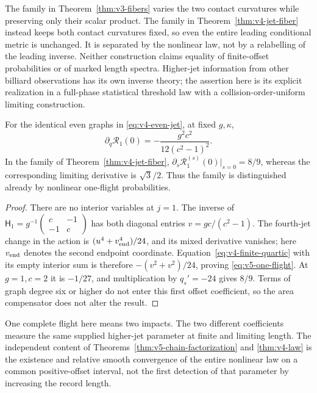 The family in Theorem~\ref{thm:v3-fibers} varies the two contact
curvatures while preserving only their scalar product. The family in
Theorem~\ref{thm:v4-jet-fiber} instead keeps both contact curvatures
fixed, so even the entire leading conditional metric is unchanged.
It is separated by the nonlinear law, not by a relabelling of the
leading inverse. Neither construction claims equality of finite-offset
probabilities or of marked length spectra. Higher-jet information from
other billiard observations has its own inverse theory; the assertion
here is its explicit realization in a full-phase statistical threshold
law with a collision-order-uniform limiting construction.


\begin{proposition}
\label{prop:v5-one-flight}
For the identical even graphs in \eqref{eq:v4-even-jet}, at fixed
$g,\kappa$,
\begin{equation}\label{eq:v5-one-flight}
 \partial_q\mathcal R_1(0)=-\frac{g^2c^2}{12(c^2-1)^2}.
\end{equation}
In the family of Theorem~\ref{thm:v4-jet-fiber},
$\partial_s\mathcal R_1^{(s)}(0)|_{s=0}=8/9$, whereas the corresponding
limiting derivative is $\sqrt3/2$. Thus the family is distinguished
already by nonlinear one-flight probabilities.
\end{proposition}
\begin{proof}
There are no interior variables at $j=1$. The inverse of
$\mathsf H_1=g^{-1}\left(\begin{smallmatrix}c&-1\\-1&c\end{smallmatrix}\right)$
has both diagonal entries $v=gc/(c^2-1)$. The fourth-jet change in the
action is $(u^4+v_{\rm end}^4)/24$, and its mixed derivative vanishes;
here $v_{\rm end}$ denotes the second endpoint coordinate.
Equation~\eqref{eq:v4-finite-quartic} with its empty interior sum is
therefore $-(v^2+v^2)/24$, proving \eqref{eq:v5-one-flight}.
At $g=1,c=2$ it is $-1/27$, and multiplication by $q_s'=-24$ gives
$8/9$. Terms of graph degree six or higher do not enter this first
offset coefficient, so the area compensator does not alter the result.
\end{proof}

One complete flight here means two impacts. The two different
coefficients measure the same supplied higher-jet parameter at
finite and limiting length. The independent content of
Theorems~\ref{thm:v5-chain-factorization} and \ref{thm:v4-law} is the
existence and relative smooth convergence of the entire nonlinear law
on a common positive-offset interval, not the first detection of that
parameter by increasing the record length.
